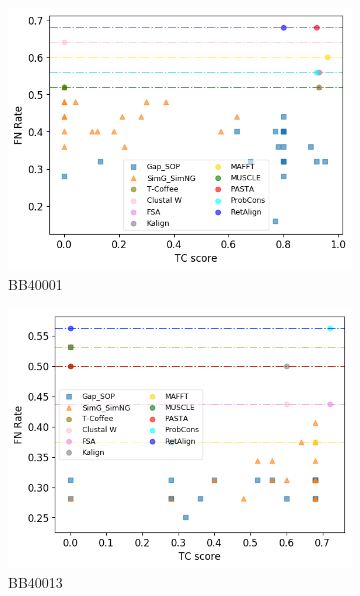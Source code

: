 \begin{figure}[!htbp]
	\centering
	\begin{adjustwidth}{-1cm}{-1cm}
		\begin{subfigure}{0.22\textwidth}
			\includegraphics[width=\columnwidth]{Figure/summary/precomputedInit/Balibase/BB40001_fnrate_vs_tc_2}
			\caption{BB40001}
		\end{subfigure}	
		\begin{subfigure}{0.22\textwidth}
			\includegraphics[width=\columnwidth]{Figure/summary/precomputedInit/Balibase/BB40013_fnrate_vs_tc_2}
			\caption{BB40013}
		\end{subfigure}
		\begin{subfigure}{0.22\textwidth}

\end{subfigure}
\end{adjustwidth}
\end{figure}
